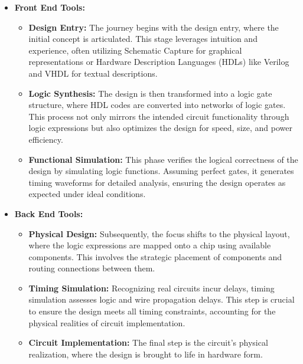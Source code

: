\documentclass[12pt,openany, tikz,border=10pt]{book}
\begin{document}
\begin{itemize}
    \item[]\textbf{Front End Tools:}
    \begin{itemize}
    \item \textbf{Design Entry:} The journey begins with the design entry, where the initial concept is articulated. This stage leverages intuition and experience, often utilizing Schematic Capture for graphical representations or Hardware Description Languages (HDLs) like Verilog and VHDL for textual descriptions.
    \item \textbf{Logic Synthesis:} The design is then transformed into a logic gate structure, where HDL codes are converted into networks of logic gates. This process not only mirrors the intended circuit functionality through logic expressions but also optimizes the design for speed, size, and power efficiency.
    \item \textbf{Functional Simulation:} This phase verifies the logical correctness of the design by simulating logic functions. Assuming perfect gates, it generates timing waveforms for detailed analysis, ensuring the design operates as expected under ideal conditions.
 \end{itemize}
 \item[]\textbf{Back End Tools:}
    \begin{itemize}
        \item \textbf{Physical Design:} Subsequently, the focus shifts to the physical layout, where the logic expressions are mapped onto a chip using available components. This involves the strategic placement of components and routing connections between them.
    \item \textbf{Timing Simulation:} Recognizing real circuits incur delays, timing simulation assesses logic and wire propagation delays. This step is crucial to ensure the design meets all timing constraints, accounting for the physical realities of circuit implementation.
    \item \textbf{Circuit Implementation:} The final step is the circuit's physical realization, where the design is brought to life in hardware form.
    \end{itemize}
    
    
\end{itemize}
\end{document}
